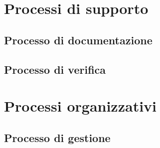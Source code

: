 \documentclass[a4paper,titlepage]{article}
\begin{document}
\section{Processi di supporto}
\label{sec:3}
	\subsection{Processo di documentazione}
	\label{sec:3.1}
		
	\subsection{Processo di verifica}
	\label{sec:3.2}
		

\section{Processi organizzativi}
\label{sec:4}
	\subsection{Processo di gestione}
	\label{sec:4.1}
		
\end{document}

